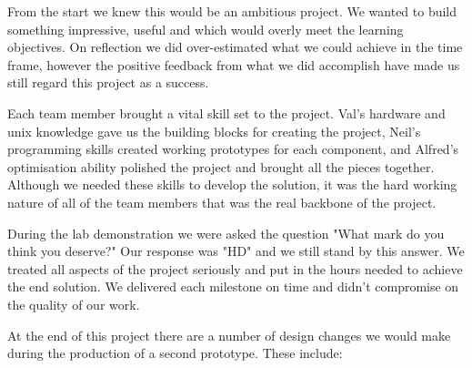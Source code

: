 \documentclass[11pt,a4paper,titlepage]{report}
\begin{document}
From the start we knew this would be an ambitious project. We wanted to build something impressive, useful and which would overly meet the learning objectives. On reflection we did over-estimated what we could achieve in the time frame, however the positive feedback from what we did accomplish have made us still regard this project as a success.

Each team member brought a vital skill set to the project. Val's hardware and unix knowledge gave us the building blocks for creating the project, Neil's programming skills created working prototypes for each component, and Alfred's optimisation ability polished the project and brought all the pieces together. Although we needed these skills to develop the solution, it was the hard working nature of all of the team members that was the real backbone of the project.



During the lab demonstration we were asked the question "What mark do you think you deserve?" Our response was "HD" and we still stand by this answer. We treated all aspects of the project seriously and put in the hours needed to achieve the end solution. We delivered each milestone on time and didn't compromise on the quality of our work.


At the end of this project there are a number of design changes we would make during the production of a second prototype. These include:
\end{document}
